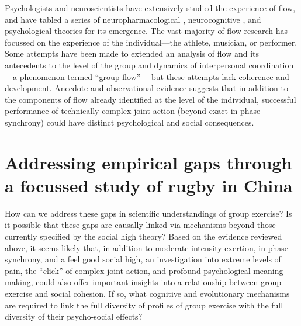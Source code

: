 \begin{CJK}{UTF8}{gbsn}
Psychologists and neuroscientists have extensively studied the experience of flow, and have tabled a series of neuropharmacological \citep{Boecker2008}, neurocognitive \citep{Dietrich2006,Dietrich2011,Labelle2013}, and psychological \citep{Csikszentmihalyi1992} theories for its emergence.  The vast majority of flow research has focussed on the experience of the individual---the athlete, musician, or performer.  Some attempts have been made to extended an analysis of flow and its antecedents to the level of the group and dynamics of interpersonal coordination---a phenomenon termed ``group flow'' \citep{Sawyer2006}---but these attempts lack coherence and development.  Anecdote and observational evidence suggests that in addition to the components of flow already identified at the level of the individual, successful performance of technically complex joint action (beyond exact in-phase synchrony) could have distinct psychological and social consequences.











\section{Addressing empirical gaps through a focussed study of rugby in China}
How can we address these gaps in scientific understandings of group exercise?  Is it possible that these gaps are causally linked via mechanisms beyond those currently specified by the social high theory?
Based on the evidence reviewed above, it seems likely that, in addition to moderate intensity exertion, in-phase synchrony, and a feel good social high, an investigation into extreme levels of pain, the ``click'' of complex joint action, and profound psychological meaning making, could also offer important insights into a relationship between group exercise and social cohesion.  If so, what cognitive and evolutionary mechanisms are required to link the full diversity of profiles of group exercise with the full diversity of their psycho-social effects?


\end{CJK}
